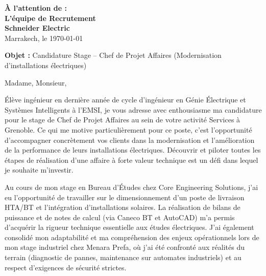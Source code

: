\documentclass[10pt,a4paper]{../../templates/altacv}
\makeatletter
\renewcommand{\makecvheader}{%
  \begingroup
    \raggedright\color{emphasis}%
    {\Huge\bfseries\MakeUppercase{\@name}\par}
    \medskip
    {\large\bfseries\color{accent}\@tagline\par}
    \medskip
    {\footnotesize\bfseries\@personalinfo\par}
  \endgroup\medskip
}
\makeatother
\begin{document}

\makecvheader

\bigskip
\medskip

\begin{flushright}
  {\color{emphasis}\textbf{À l'attention de :}} \\[2pt]
  \textbf{L'équipe de Recrutement} \\
  \textbf{Schneider Electric} \\[20pt]
  Marrakech, le \today
\end{flushright}
\bigskip

\bigskip

{\color{accent}\textbf{Objet :}} Candidature Stage -- Chef de Projet Affaires (Modernisation d'installations électriques)

\bigskip\bigskip

Madame, Monsieur,

\vspace{0.4cm}

Élève ingénieur en dernière année de cycle d'ingénieur en Génie Électrique et Systèmes Intelligents à l'EMSI, je vous adresse avec enthousiasme ma candidature pour le stage de Chef de Projet Affaires au sein de votre activité Services à Grenoble. Ce qui me motive particulièrement pour ce poste, c'est l'opportunité d'accompagner concrètement vos clients dans la modernisation et l'amélioration de la performance de leurs installations électriques. Découvrir et piloter toutes les étapes de réalisation d'une affaire à forte valeur technique est un défi dans lequel je souhaite m'investir.

\vspace{0.4cm}

Au cours de mon stage en Bureau d'Études chez Core Engineering Solutions, j'ai eu l'opportunité de travailler sur le dimensionnement d'un poste de livraison HTA/BT et l'intégration d'installations solaires. La réalisation de bilans de puissance et de notes de calcul (via Caneco BT et AutoCAD) m'a permis d'acquérir la rigueur technique essentielle aux études électriques. J'ai également consolidé mon adaptabilité et ma compréhension des enjeux opérationnels lors de mon stage industriel chez Menara Prefa, où j'ai été confronté aux réalités du terrain (diagnostic de pannes, maintenance sur automates industriels) et au respect d'exigences de sécurité strictes.
\end{document}
